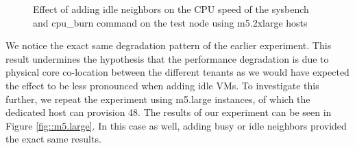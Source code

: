 \begin{figure}[H]
\centering
{}
\caption{Effect of adding idle neighbors on the CPU speed of the sysbench and cpu\_burn command on the test node using m5.2xlarge hosts} 
\label{fig::m5.2xlarge_idle}
\end{figure}
\noindent
We notice the exact same degradation pattern of the earlier experiment. This result undermines 
the hypothesis that the performance degradation is due to physical core co-location between the different 
tenants as we would have expected the effect to be less pronounced when adding idle VMs. To investigate 
this further, we repeat the experiment using m5.large instances, of which the dedicated host can 
provision 48. The results of our experiment can be seen in Figure \ref{fig::m5.large}. In this 
case as well, adding busy or idle neighbors provided the exact same results.  

